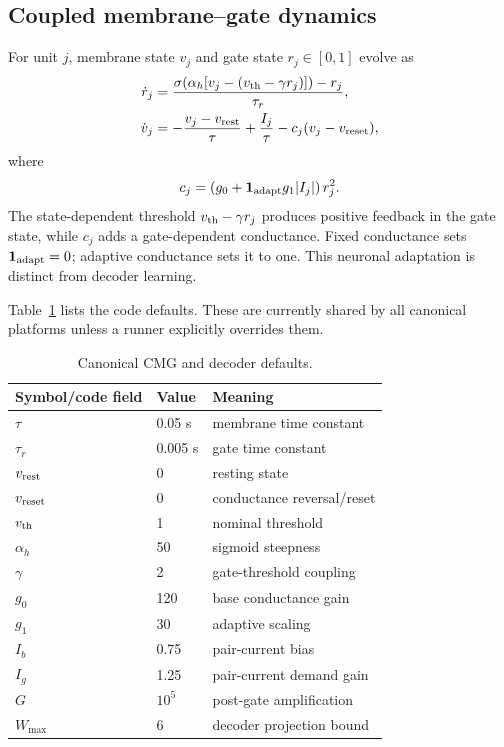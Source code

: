 \documentclass[10pt,twocolumn]{article}
\begin{document}
\subsection{Coupled membrane--gate dynamics}

For unit $j$, membrane state $v_j$ and gate state $r_j\in[0,1]$ evolve as
\begin{align}
    \dot r_j &= \frac{\sigma\!\left(
    \alpha_h[v_j-(v_{\rm th}-\gamma r_j)]\right)-r_j}{\tau_r},
    \label{eq:gate}\\
    \dot v_j &= -\frac{v_j-v_{\rm rest}}{\tau}
    +\frac{I_j}{\tau}-c_j(v_j-v_{\rm reset}),
    \label{eq:membrane}
\end{align}
where
\begin{equation}
    c_j=\left(g_0+\mathbf{1}_{\rm adapt}g_1|I_j|\right)r_j^2.
\end{equation}
The state-dependent threshold $v_{\rm th}-\gamma r_j$ produces positive
feedback in the gate state, while $c_j$ adds a gate-dependent conductance.
Fixed conductance sets $\mathbf{1}_{\rm adapt}=0$; adaptive conductance sets it
to one. This neuronal adaptation is distinct from decoder learning.

Table~\ref{tab:hyperparams} lists the code defaults. These are currently shared
by all canonical platforms unless a runner explicitly overrides them.

\begin{table}[t]
\centering
\caption{Canonical CMG and decoder defaults.}
\label{tab:hyperparams}
\small
\begin{tabular}{lll}
\toprule
Symbol/code field & Value & Meaning \\
\midrule
$\tau$ & 0.05 s & membrane time constant \\
$\tau_r$ & 0.005 s & gate time constant \\
$v_{\rm rest}$ & 0 & resting state \\
$v_{\rm reset}$ & 0 & conductance reversal/reset \\
$v_{\rm th}$ & 1 & nominal threshold \\
$\alpha_h$ & 50 & sigmoid steepness \\
$\gamma$ & 2 & gate-threshold coupling \\
$g_0$ & 120 & base conductance gain \\
$g_1$ & 30 & adaptive scaling \\
$I_b$ & 0.75 & pair-current bias \\
$I_g$ & 1.25 & pair-current demand gain \\
$G$ & $10^5$ & post-gate amplification \\
$W_{\max}$ & 6 & decoder projection bound \\
\bottomrule
\end{tabular}
\end{table}
\end{document}
